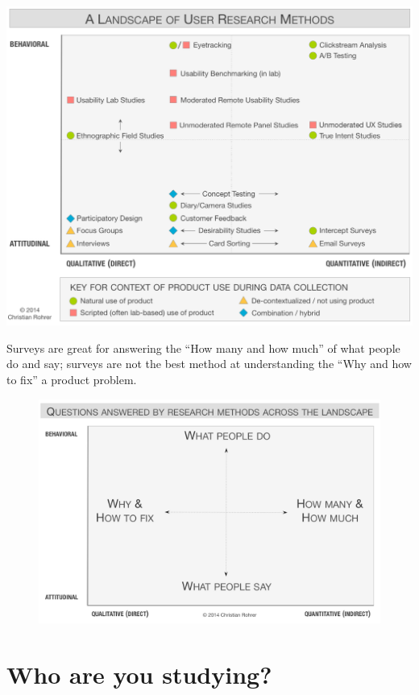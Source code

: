 \documentclass[]{book}
\begin{document}
\begin{center}\includegraphics{figs/nng_ux_methods_chart2} \end{center}

Surveys are great for answering the ``How many and how much'' of what
people do and say; surveys are not the best method at understanding the
``Why and how to fix'' a product problem.

\begin{figure}
\centering
\includegraphics{figs/nng_ux_methods_chart.png}
\caption{}
\end{figure}

\section{Who are you studying?}\label{who-are-you-studying}
\end{document}
